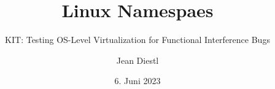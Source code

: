 \documentclass{sdqbeamer}
\title[Linux Namespaces]{Linux Namespaes}
\subtitle{KIT: Testing OS-Level Virtualization
for Functional Interference Bugs}
\author[Jean Diestl]{Jean Diestl}
\date[6.\,6.\,2023]{6. Juni 2023}
\begin{document}
\KITtitleframe
\grouplogo{}




%


%



%

\end{document}
